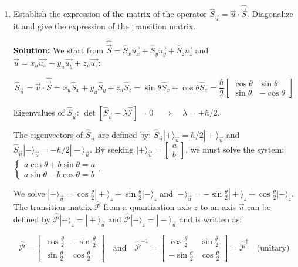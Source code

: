 \documentclass{article}
\begin{document}
    \begin{enumerate}
        \item Establish the expression of the matrix of the operator $\hat{S}_{\vec{u}} = \vec{u} \cdot \hat{\vec{S}}$. Diagonalize it and give the expression of the transition matrix.

        {\color{red}\textbf{Solution:} We start from $\hat{\vec{S}} = \hat{S}_{x} \overrightarrow{u_{x}} + \hat{S}_{y} \overrightarrow{u_{y}} + \hat{S}_{z} \overrightarrow{u_{z}}$ and $\vec{u} = x_{u} \overrightarrow{u_{x}} + y_{u} \overrightarrow{u_{y}} + z_{u} \overrightarrow{u_{z}}$:

        $$
        \hat{S}_{\vec{u}} = \vec{u} \cdot \hat{\vec{S}} = x_{u} \hat{S}_{x} + y_{u} \hat{S}_{y} + z_{u} \hat{S}_{z} = \sin \theta \hat{S}_{x} + \cos \theta \hat{S}_{z} = \frac{\hbar}{2} \begin{bmatrix}
        \cos \theta & \sin \theta \\
        \sin \theta & -\cos \theta
        \end{bmatrix}
        $$

        Eigenvalues of $\hat{S}_{\vec{u}}$: $\det\left[\hat{S}_{\vec{u}} - \lambda \hat{\mathcal{I}}\right] = 0 \quad \Rightarrow \quad \lambda = \pm \hbar / 2$.

        The eigenvectors of $\hat{S}_{\vec{u}}$ are defined by: $\hat{S}_{\vec{u}} |+\rangle_{\vec{u}} = \hbar / 2 |+\rangle_{\vec{u}}$ and $\hat{S}_{\vec{u}} |-\rangle_{\vec{u}} = -\hbar / 2 |-\rangle_{\vec{u}}$. By seeking $|+\rangle_{\vec{u}} = \begin{bmatrix} a \\ b \end{bmatrix}$, we must solve the system: $\begin{cases} a \cos \theta + b \sin \theta = a \\ a \sin \theta - b \cos \theta = b \end{cases}$.

        We solve $|+\rangle_{\vec{u}} = \cos \frac{\theta}{2} |+\rangle_{z} + \sin \frac{\theta}{2} |-\rangle_{z}$ and $|-\rangle_{\vec{u}} = -\sin \frac{\theta}{2} |+\rangle_{z} + \cos \frac{\theta}{2} |-\rangle_{z}$. The transition matrix $\hat{\mathcal{P}}$ from a quantization axis $z$ to an axis $\vec{u}$ can be defined by $\hat{\mathcal{P}} |+\rangle_{z} = |+\rangle_{\vec{u}}$ and $\hat{\mathcal{P}} |-\rangle_{z} = |-\rangle_{\vec{u}}$ and is written as:

        $$
        \hat{\mathcal{P}} = \begin{bmatrix}
        \cos \frac{\theta}{2} & -\sin \frac{\theta}{2} \\
        \sin \frac{\theta}{2} & \cos \frac{\theta}{2}
        \end{bmatrix} \quad \text{and} \quad \hat{\mathcal{P}}^{-1} = \begin{bmatrix}
        \cos \frac{\theta}{2} & \sin \frac{\theta}{2} \\
        -\sin \frac{\theta}{2} & \cos \frac{\theta}{2}
        \end{bmatrix} = \hat{\mathcal{P}}^{\dagger} \quad \text{(unitary)}
        $$

}
\end{enumerate}
\end{document}
